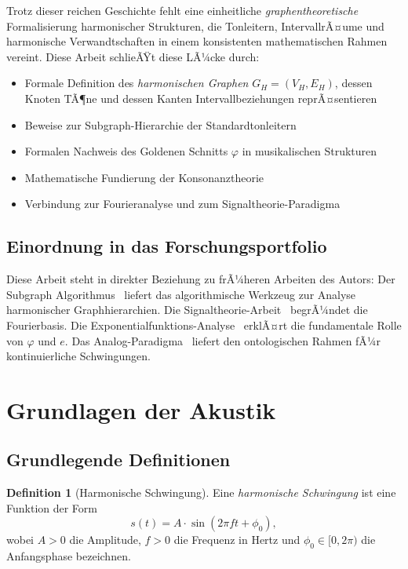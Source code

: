 ﻿\documentclass[a4paper,12pt]{article}
\theoremstyle{definition}
\newtheorem{definition}{Definition}
\begin{document}
Trotz dieser reichen Geschichte fehlt eine einheitliche \emph{graphentheoretische}
Formalisierung harmonischer Strukturen, die Tonleitern, IntervallrÃ¤ume und
harmonische Verwandtschaften in einem konsistenten mathematischen Rahmen vereint.
Diese Arbeit schlieÃŸt diese LÃ¼cke durch:

\begin{itemize}
    \item Formale Definition des \emph{harmonischen Graphen} $G_H = (V_H, E_H)$,
          dessen Knoten TÃ¶ne und dessen Kanten Intervallbeziehungen reprÃ¤sentieren
    \item Beweise zur Subgraph-Hierarchie der Standardtonleitern
    \item Formalen Nachweis des Goldenen Schnitts $\varphi$ in musikalischen Strukturen
    \item Mathematische Fundierung der Konsonanztheorie
    \item Verbindung zur Fourieranalyse und zum Signaltheorie-Paradigma
\end{itemize}

\subsection{Einordnung in das Forschungsportfolio}

Diese Arbeit steht in direkter Beziehung zu frÃ¼heren Arbeiten des Autors:
Der Subgraph Algorithmus~\cite{epp2026subgraph} liefert das algorithmische Werkzeug
zur Analyse harmonischer Graphhierarchien. Die Signaltheorie-Arbeit~\cite{epp2026signal}
begrÃ¼ndet die Fourierbasis. Die Exponentialfunktions-Analyse~\cite{epp2026expl} erklÃ¤rt
die fundamentale Rolle von $\varphi$ und $e$. Das Analog-Paradigma~\cite{epp2026analog}
liefert den ontologischen Rahmen fÃ¼r kontinuierliche Schwingungen.

\section{Grundlagen der Akustik}

\subsection{Grundlegende Definitionen}

\begin{definition}[Harmonische Schwingung]
Eine \emph{harmonische Schwingung} ist eine Funktion der Form
\[
s(t) = A \cdot \sin(2\pi f t + \phi_0),
\]
wobei $A > 0$ die Amplitude, $f > 0$ die Frequenz in Hertz und $\phi_0 \in [0, 2\pi)$
die Anfangsphase bezeichnen.
\end{definition}
\end{document}
